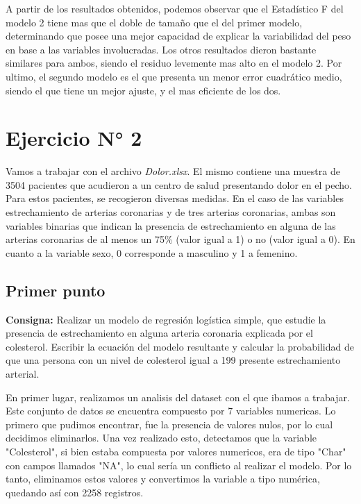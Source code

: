 \documentclass{article} %
\begin{document}
A partir de los resultados obtenidos, podemos observar que el Estadístico F del modelo 2 tiene mas que el doble de tamaño que el del primer modelo, determinando que posee una mejor capacidad de explicar la variabilidad del peso en base a las variables involucradas. Los otros resultados dieron bastante similares para ambos, siendo el residuo levemente mas alto en el modelo 2. Por ultimo, el segundo modelo es el que presenta un menor error cuadrático medio, siendo el que tiene un mejor ajuste, y el mas eficiente de los dos.

\section{Ejercicio N° 2}

Vamos a trabajar con el archivo \textit{Dolor.xlsx}. El mismo contiene una muestra de 3504 pacientes que acudieron a un centro de salud presentando dolor en el pecho. Para estos pacientes, se recogieron diversas medidas. En el caso de las variables estrechamiento de arterias coronarias y de tres arterias coronarias, ambas son variables binarias que indican la presencia de estrechamiento en alguna de las arterias coronarias de al menos un 75\% (valor igual a 1) o no (valor igual a 0). En cuanto a la variable sexo, 0 corresponde a masculino y 1 a femenino.

\subsection{Primer punto}

\textbf{Consigna:} Realizar un modelo de regresión logística simple, que estudie la presencia de estrechamiento en alguna arteria coronaria explicada por el colesterol. Escribir la ecuación del modelo resultante y calcular la probabilidad de que una persona con un nivel de colesterol igual a 199 presente estrechamiento arterial.

En primer lugar, realizamos un analisis del dataset con el que ibamos a trabajar. Este conjunto de datos se encuentra compuesto por 7 variables numericas. Lo primero que pudimos encontrar, fue la presencia de valores nulos, por lo cual decidimos eliminarlos. Una vez realizado esto, detectamos que la variable "Colesterol", si bien estaba compuesta por valores numericos, era de tipo "Char" con campos llamados "NA", lo cual sería un conflicto al realizar el modelo. Por lo tanto, eliminamos estos valores y convertimos la variable a tipo numérica, quedando así con 2258 registros. 
\end{document}
